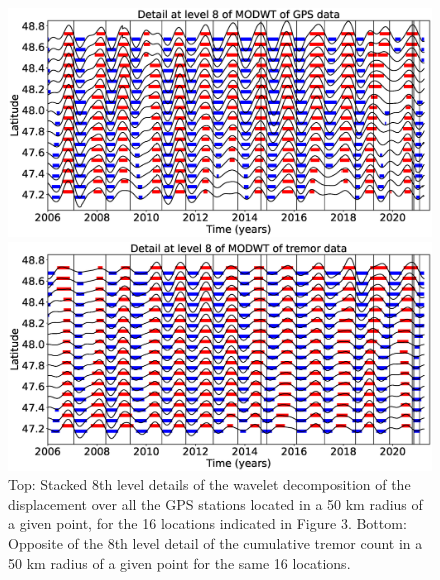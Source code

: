 \documentclass{article}
\begin{document}
\begin{figure}
\noindent\includegraphics[width=\textwidth, trim={0cm 0cm 0cm 0cm},clip]{figures/GPS_longer_detail_8.eps}

\noindent\includegraphics[width=\textwidth, trim={0cm 0cm 0cm 0cm},clip]{figures/tremor_longer_detail_8.eps}
\caption{Top: Stacked 8th level details of the wavelet decomposition of the displacement over all the GPS stations located in a 50 km radius of a given point, for the 16 locations indicated in Figure 3. Bottom: Opposite of the 8th level detail of the cumulative tremor count in a 50 km radius of a given point for the same 16 locations.}
\label{pngfiguresample}
\end{figure}
\end{document}
